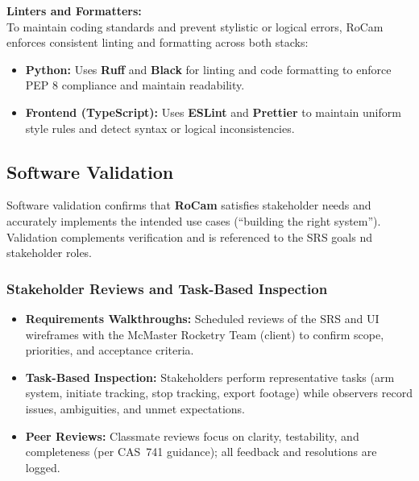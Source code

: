 \documentclass[12pt, titlepage]{article}
\begin{document}
\textbf{Linters and Formatters:} \\
To maintain coding standards and prevent stylistic or logical errors, RoCam enforces
consistent linting and formatting across both stacks:
\begin{itemize}
  \item \textbf{Python:} Uses \textbf{Ruff} and \textbf{Black} for linting and code
        formatting to enforce PEP 8 compliance and maintain readability.
  \item \textbf{Frontend (TypeScript):} Uses \textbf{ESLint} and \textbf{Prettier} to
        maintain uniform style rules and detect syntax or logical inconsistencies.
\end{itemize}




\subsection{Software Validation}

Software validation confirms that \textbf{RoCam} satisfies stakeholder needs
and accurately implements the intended use cases (``building the right
system''). Validation complements verification and is referenced to the SRS
goals nd stakeholder roles.

\subsubsection*{Stakeholder Reviews and Task-Based Inspection}
\begin{itemize}
  \item \textbf{Requirements Walkthroughs:} Scheduled reviews of the SRS
        and UI wireframes with the McMaster Rocketry Team (client) to confirm
        scope, priorities, and acceptance criteria.
  \item \textbf{Task-Based Inspection:} Stakeholders perform
        representative tasks (arm system, initiate tracking, stop tracking, export
        footage) while observers record issues, ambiguities, and unmet expectations.
  \item \textbf{Peer Reviews:} Classmate reviews focus on clarity,
        testability, and completeness (per CAS~741 guidance); all feedback and
        resolutions are logged.
\end{itemize}
\end{document}
